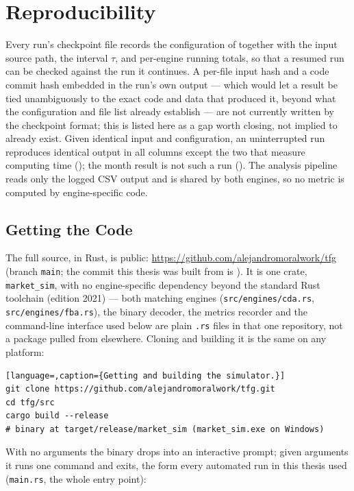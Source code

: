 \chapter{Reproducibility}
\label{app:repro}

Every run's checkpoint file records the configuration of
 together with the input source path, the interval
$\tau$, and per-engine running totals, so that a resumed run can be
checked against the run it continues. A per-file input hash and a code
commit hash embedded in the run's own output --- which would let a
result be tied unambiguously to the exact code and data that produced
it, beyond what the configuration and file list already establish ---
are not currently written by the checkpoint format; this is listed here
as a gap worth closing, not implied to already exist. Given identical
input and configuration, an uninterrupted run reproduces identical
output in all columns except the two that measure computing time
(); the month result is not such a run
(). The analysis pipeline reads only the
logged CSV output and is shared by both engines, so no metric is
computed by engine-specific code.

\section{Getting the Code}
\label{sec:repro_code}

The full source, in Rust, is public:
\url{https://github.com/alejandromoralwork/tfg} (branch \texttt{main}; the commit
this thesis was built from is ).
It is one crate, \texttt{market\_sim}, with no engine-specific dependency beyond
the standard Rust toolchain (edition 2021) --- both matching engines
(\texttt{src/engines/cda.rs}, \texttt{src/engines/fba.rs}), the binary decoder,
the metrics recorder and the command-line interface used below are plain
\texttt{.rs} files in that one repository, not a package pulled from elsewhere.
Cloning and building it is the same on any platform:

\begin{lstlisting}[language=,caption={Getting and building the simulator.}]
git clone https://github.com/alejandromoralwork/tfg.git
cd tfg/src
cargo build --release
# binary at target/release/market_sim (market_sim.exe on Windows)
\end{lstlisting}

With no arguments the binary drops into an interactive prompt; given arguments it
runs one command and exits, the form every automated run in this thesis used
(\texttt{main.rs}, the whole entry point):

